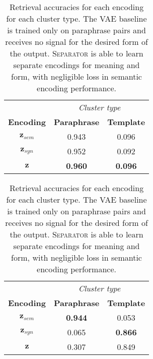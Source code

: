 \documentclass[11pt,a4paper]{article}
\begin{document}
\begin{table}[t!]
\begin{subtable}[]{0.49\textwidth}
        \centering
        \begin{tabular}{c||cc}
        & \multicolumn{2}{c}{\textit{Cluster type}} \\
       \textbf{Encoding} & \textbf{Paraphrase} & \textbf{Template} \\
        \hhline{=#==}
        $\textbf{z}_{sem}$ & \cellcolor{OrangeRed!94}\color{white}0.943 & \cellcolor{OrangeRed!9}0.096 \\
        $\textbf{z}_{syn}$ & \cellcolor{OrangeRed!95}\color{white}0.952 & \cellcolor{OrangeRed!9}0.092 \\
        \hline
        $\textbf{z}$ & \cellcolor{OrangeRed!96}\color{white}\textbf{0.960} & \cellcolor{OrangeRed!9}\textbf{0.096} \\
        \end{tabular}
        \caption{VAE Baseline}
        \label{tab:separation_baseline}
    \end{subtable}
    
\vspace{.1cm}
  \hfill
    \begin{subtable}[]{0.49\textwidth}
    
        \centering
        \begin{tabular}{c||cc}
        & \multicolumn{2}{c}{\textit{Cluster type}} \\
       \textbf{Encoding} & \textbf{Paraphrase} & \textbf{Template} \\
        \hhline{=#==}
        $\textbf{z}_{sem}$ & \cellcolor{OrangeRed!94}\color{white}\textbf{0.944} & \cellcolor{OrangeRed!5}0.053 \\
        $\textbf{z}_{syn}$ & \cellcolor{OrangeRed!6}0.065 & \cellcolor{OrangeRed!86}\color{white}\textbf{0.866} \\
        \hline
        $\textbf{z}$ & \cellcolor{OrangeRed!31}0.307 & \cellcolor{OrangeRed!85}\color{white}0.849 \\
        \end{tabular}
        \caption{\textsc{Separator}}
        \label{tab:separation_ours}
    \end{subtable}
\caption{Retrieval accuracies for each encoding for each cluster type. The VAE baseline is trained only on paraphrase pairs and receives no signal for the desired form of the output. \textsc{Separator} is able to learn separate encodings for meaning and form, with negligible loss in semantic encoding performance.}
    \label{tab:separation}
\end{table}
\end{document}
